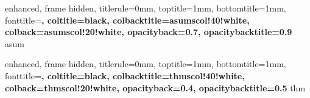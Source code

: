 

{
  enhanced,
  frame hidden,
  titlerule=0mm,
  toptitle=1mm,
  bottomtitle=1mm,
  fonttitle=\bfseries\large,
  coltitle=black,
  colbacktitle=asumscol!40!white,
  colback=asumscol!20!white,
  opacityback=0.7, %
  opacitybacktitle=0.9
}{asum}




{
  enhanced,
  frame hidden,
  titlerule=0mm,
  toptitle=1mm,
  bottomtitle=1mm,
  fonttitle=\bfseries\large,
  coltitle=black,
  colbacktitle=thmscol!40!white,
  colback=thmscol!20!white,
  opacityback=0.4, %
  opacitybacktitle=0.5
}{thm}







